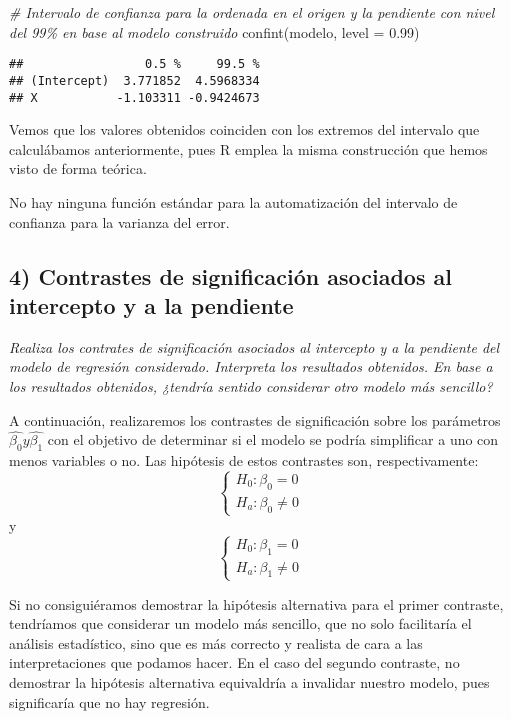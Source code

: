 \documentclass[
]{article}
\newenvironment{Shaded}{\begin{snugshade}}{\end{snugshade}}
\newcommand{\AttributeTok}[1]{\textcolor[rgb]{0.77,0.63,0.00}{#1}}
\newcommand{\CommentTok}[1]{\textcolor[rgb]{0.56,0.35,0.01}{\textit{#1}}}
\newcommand{\FloatTok}[1]{\textcolor[rgb]{0.00,0.00,0.81}{#1}}
\newcommand{\FunctionTok}[1]{\textcolor[rgb]{0.00,0.00,0.00}{#1}}
\newcommand{\NormalTok}[1]{#1}
\begin{document}
\begin{Shaded}
\begin{Highlighting}[]
\CommentTok{\# Intervalo de confianza para la ordenada en el origen y la pendiente con nivel del 99\% en base al modelo construido}
\FunctionTok{confint}\NormalTok{(modelo, }\AttributeTok{level =} \FloatTok{0.99}\NormalTok{)}
\end{Highlighting}
\end{Shaded}

\begin{verbatim}
##                 0.5 %     99.5 %
## (Intercept)  3.771852  4.5968334
## X           -1.103311 -0.9424673
\end{verbatim}

Vemos que los valores obtenidos coinciden con los extremos del intervalo
que calculábamos anteriormente, pues R emplea la misma construcción que
hemos visto de forma teórica.

No hay ninguna función estándar para la automatización del intervalo de
confianza para la varianza del error.

\hypertarget{contrastes-de-significaciuxf3n-asociados-al-intercepto-y-a-la-pendiente}{%
\subsection{4) Contrastes de significación asociados al intercepto y a
la
pendiente}\label{contrastes-de-significaciuxf3n-asociados-al-intercepto-y-a-la-pendiente}}

\textit{Realiza los contrates de significación asociados al intercepto y a la pendiente del modelo de regresión considerado. Interpreta los resultados obtenidos. En base a los resultados obtenidos, ¿tendría sentido considerar otro modelo más sencillo?}

A continuación, realizaremos los contrastes de significación sobre los
parámetros \(\hat{\beta_0} y \hat{\beta_1}\) con el objetivo de
determinar si el modelo se podría simplificar a uno con menos variables
o no. Las hipótesis de estos contrastes son, respectivamente: \[
\begin{cases}
H_0: \beta_0 = 0\\
H_a: \beta_0 \neq 0
\end{cases}
\] y \[
\begin{cases}
H_0: \beta_1 = 0\\
H_a: \beta_1 \neq 0
\end{cases}
\]

Si no consiguiéramos demostrar la hipótesis alternativa para el primer
contraste, tendríamos que considerar un modelo más sencillo, que no solo
facilitaría el análisis estadístico, sino que es más correcto y realista
de cara a las interpretaciones que podamos hacer. En el caso del segundo
contraste, no demostrar la hipótesis alternativa equivaldría a invalidar
nuestro modelo, pues significaría que no hay regresión.
\end{document}
